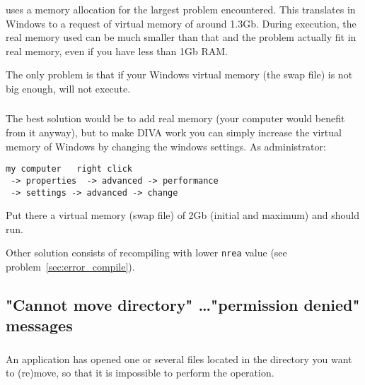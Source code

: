 \diva uses a memory allocation for the largest problem encountered. This 
translates in Windows to a request of virtual memory of around 1.3Gb.
During execution, the real memory used can be much smaller than that and 
the problem actually fit in real memory, even if you have less than 1Gb RAM.

The only problem is that if your Windows virtual memory (the swap file) 
is not big enough, \diva will not execute.


\subsubsection{\answer}

The best solution would be to 
add real memory (your computer would benefit from it anyway), but to 
make DIVA work you can simply increase the virtual memory of Windows by 
changing the windows settings. As administrator:\\

\begin{verbatim}
my computer   right click
 -> properties  -> advanced -> performance
 -> settings -> advanced -> change
\end{verbatim}

Put there a virtual memory (swap file) of 2Gb (initial and maximum) and 
\diva should run. 

Other solution consists of recompiling with lower \texttt{nrea} value (see problem~\ref{sec:error_compile}).



\subsection{"Cannot move directory" \ldots "permission denied" messages}



\subsubsection{\question}

An application has opened one or several files located in the directory you want to (re)move, so that it is impossible to perform the operation.

